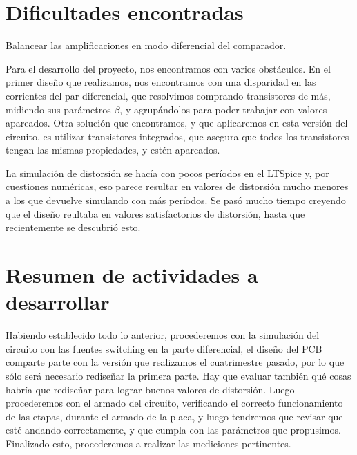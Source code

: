 \documentclass[a4paper,12pt,twoside]{article}
\begin{document}
\section{Dificultades encontradas}

Balancear las amplificaciones en modo diferencial del comparador.


Para el desarrollo del proyecto, nos encontramos con varios obstáculos. En el primer diseño que realizamos, nos encontramos con una disparidad en las corrientes del par diferencial, que resolvimos comprando transistores de más, midiendo sus parámetros $\beta$, y agrupándolos para poder trabajar con valores apareados. Otra solución que encontramos, y que aplicaremos en esta versión del circuito, es utilizar transistores integrados, que asegura que todos los transistores tengan las mismas propiedades, y estén apareados.

La simulación de distorsión se hacía con pocos períodos en el LTSpice y, por cuestiones numéricas, eso parece resultar en valores de distorsión mucho menores a los que devuelve simulando con más períodos. Se pasó mucho tiempo creyendo que el diseño reultaba en valores satisfactorios de distorsión, hasta que recientemente se descubrió esto.

\section{Resumen de actividades a desarrollar}

Habiendo establecido todo lo anterior, procederemos con la simulación del circuito con las fuentes switching en la parte diferencial, el diseño del PCB comparte parte con la versión que realizamos el cuatrimestre pasado, por lo que sólo será necesario rediseñar la primera parte. Hay que evaluar también qué cosas habría que rediseñar para lograr buenos valores de distorsión. Luego procederemos con el armado del circuito, verificando el correcto funcionamiento de las etapas, durante el armado de la placa, y luego tendremos que revisar que esté andando correctamente, y que cumpla con las parámetros que propusimos. Finalizado esto, procederemos a realizar las mediciones pertinentes.
\end{document}
